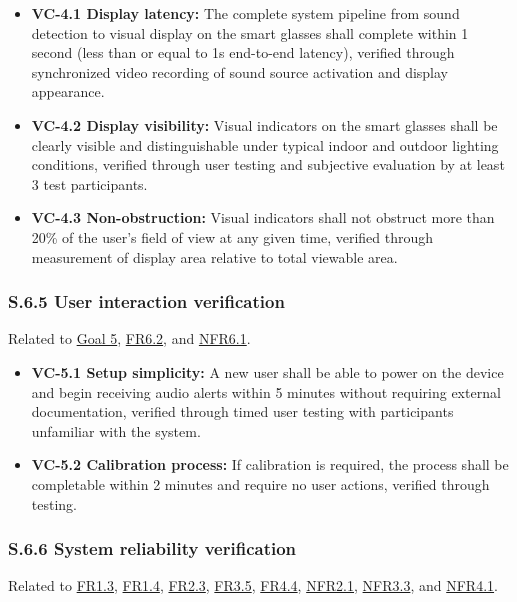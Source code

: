 \documentclass[12pt]{article}
\theoremstyle{definition}
\begin{document}
\begin{itemize}
\item \textbf{VC-4.1 Display latency:}\label{sec:VC-4.1}
The complete system pipeline from sound
detection to visual display on the smart glasses shall complete within 1 second
(less than or equal to 1s end-to-end latency), verified through synchronized
video recording of sound source activation and display appearance.

\item \textbf{VC-4.2 Display visibility:} Visual indicators on the smart glasses
shall be clearly visible and distinguishable under typical indoor and outdoor
lighting conditions, verified through user testing and subjective evaluation by
at least 3 test participants.

\item \textbf{VC-4.3 Non-obstruction:} Visual indicators shall not obstruct more
than 20\% of the user's field of view at any given time, verified through
measurement of display area relative to total viewable area.
\end{itemize}

\subsubsection{S.6.5 User interaction verification}

Related to \hyperref[goal:user_friendly_interaction]{Goal 5},
\hyperref[FR6_2]{FR6.2}, and \hyperref[NFR6_1]{NFR6.1}.

\begin{itemize}
\item \textbf{VC-5.1 Setup simplicity:} A new user shall be able to power on the
device and begin receiving audio alerts within 5 minutes without requiring
external documentation, verified through timed user testing with participants
unfamiliar with the system.

\item \textbf{VC-5.2 Calibration process:} If calibration is required, the
process shall be completable within 2 minutes and require no user actions,
verified through testing.
\end{itemize}

\subsubsection{S.6.6 System reliability verification}

Related to \hyperref[FR1_3]{FR1.3}, \hyperref[FR1_4]{FR1.4},
\hyperref[FR2_3]{FR2.3}, \hyperref[FR3_5]{FR3.5}, \hyperref[FR4_4]{FR4.4},
\hyperref[NFR2_1]{NFR2.1}, \hyperref[NFR3_3]{NFR3.3}, and
\hyperref[NFR4_1]{NFR4.1}.
\end{document}
